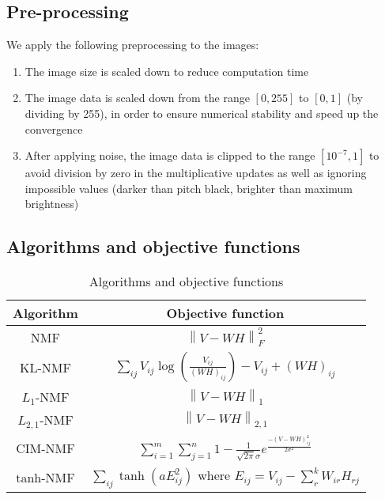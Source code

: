\documentclass{article} %
\begin{document}
\subsection{Pre-processing}
We apply the following preprocessing to the images:
\begin{enumerate}
\item The image size is scaled down to reduce computation time
\item The image data is scaled down from the range $\left[0,255\right]$ to $\left[0,1\right]$ (by dividing by 255), in order to ensure numerical stability and speed up the convergence
\item After applying noise, the image data is clipped to the range $\left[10^{-7},1\right]$ to avoid division by zero in the multiplicative updates as well as ignoring impossible values (darker than pitch black, brighter than maximum brightness)
\end{enumerate}

\subsection{Algorithms and objective functions}
\begin{table}
\begin{tabular}{|c|c|}\hline
\textbf{Algorithm} & \textbf{Objective function}\\\hline\hline
NMF & $\left\|V - WH\right\|^2_F$ \\\hline
KL-NMF & $\sum_{ij} V_{ij}\log\left(\frac{V_{ij}}{\left(WH\right)_{ij}}\right) - V_{ij} + \left(WH\right)_{ij}$ \\\hline
$L_1$-NMF & $\left\|V - WH\right\|_1$ \\\hline
$L_{2,1}$-NMF & $\left\|V - WH\right\|_{2,1}$ \\\hline
CIM-NMF & $\sum_{i=1}^{m}\sum_{j=1}^{n} 1 - \frac{1}{\sqrt{2\pi}\sigma}e^\frac{-\left(V - WH\right)_{ij}^2}{2\sigma^2}$ \\\hline
tanh-NMF & $\sum_{ij}\tanh\left(aE_{ij}^2\right)$ where $E_{ij} = V_{ij} - \sum_r^k W_{ir}H_{rj}$ \\\hline
\end{tabular}
\caption{Algorithms and objective functions \label{tab:objfunc}}
\end{table}
\end{document}
